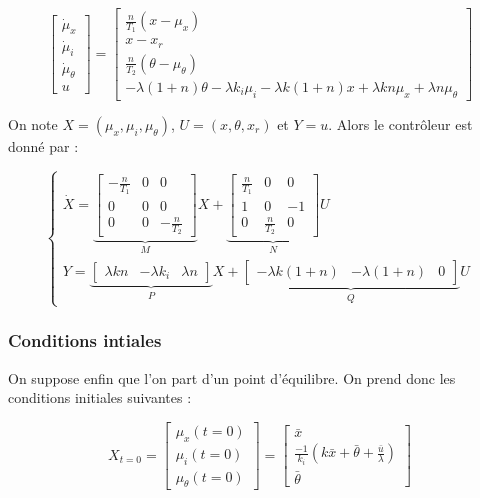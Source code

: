 \documentclass[10pt]{article}
\begin{document}
\[
	\begin{bmatrix}
		\dot \mu_x \\
		\dot \mu_i \\
		\dot \mu_\theta \\
		u
	\end{bmatrix}
	= \begin{bmatrix}
		\frac{n}{T_1} ( x - \mu_x ) \\
		x - x_r \\
		\frac{n}{T_2} ( \theta - \mu_\theta ) \\
		- \lambda ( 1 + n ) \theta - \lambda k_i \mu_i - \lambda k (1 + n) x + \lambda k n \mu_x + \lambda n \mu_\theta
	\end{bmatrix}
\]

\vspace{10px}

\noindent On note $X = (\mu_x, \mu_i, \mu_\theta)$, $U = (x, \theta, x_r)$ et $Y = u$. Alors le contrôleur est donné par :

\[
	\begin{cases}
		\dot X =
		\underbrace{
		\begin{bmatrix}
			- \frac{n}{T_1} & 0 & 0 \\
			0 & 0 & 0 \\
			0 & 0 & - \frac{n}{T_2}
		\end{bmatrix}
		}_{M} X +
		\underbrace{
		\begin{bmatrix}
			\frac{n}{T_1} & 0 & 0 \\
			1 & 0 & -1 \\
			0 & \frac{n}{T_2} & 0
		\end{bmatrix}
		}_{N} U \\
		Y = \underbrace{
		\begin{bmatrix}
			\lambda k n &  - \lambda k_i & \lambda n
		\end{bmatrix}
		}_{P} X +
		\underbrace{
		\begin{bmatrix}
			- \lambda k (1 + n) &- \lambda (1 + n) & 0
		\end{bmatrix}
		}_{Q} U
	\end{cases}
\]

\subsubsection*{Conditions intiales}

\noindent On suppose enfin que l'on part d'un point d'équilibre. On prend donc les conditions initiales suivantes :

\[
	X_{t = 0} = \begin{bmatrix}
		\mu_x (t = 0) \\
		\mu_i (t = 0) \\
		\mu_\theta (t = 0)
	\end{bmatrix}
	= \begin{bmatrix}
		\bar x \\
		\frac{-1}{k_i} ( k \bar x + \bar \theta +\frac{\bar u}{\lambda}  ) \\
		\bar \theta
	\end{bmatrix}
\]
\end{document}
